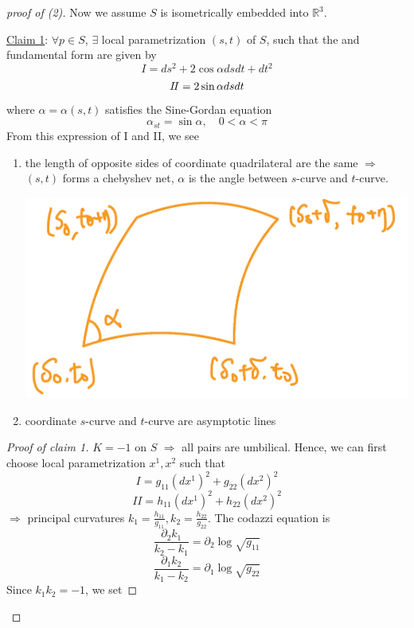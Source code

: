 \begin{proof}[proof of (2)]
    Now we assume \(S\) is isometrically embedded into \(\mathbb{R}^3\).

    \underline{Claim 1}: \(\forall p\in S\), \(\exists\) local parametrization
    \((s,t)\) of \(S\), such that the  and 
     fundamental form are given by
    \[
      I=ds^2+2\cos \alpha ds dt +dt^2  
    \]   
    \[I\!I=2\sin\alpha ds dt\]
    where \(\alpha=\alpha(s,t)\) satisfies the Sine-Gordan equation
    \[\alpha_{st}=\sin \alpha,\quad 0<\alpha<\pi\]
    From this expression of I and II, we see
    \begin{enumerate}[(1)]
        \item the length of opposite sides of coordinate quadrilateral
        are the same \(\Rightarrow\) \((s,t)\) forms a chebyshev net,
        \(\alpha\) is the angle between \(s\)-curve and \(t\)-curve.
        \begin{center}
            \includegraphics[scale=0.2]{picture/week15/quadrilateral.png}
        \end{center}
        \item coordinate \(s\)-curve and \(t\)-curve are asymptotic lines
    \end{enumerate}
    \begin{proof}[Proof of claim 1]
        \(K=-1\) on \(S\) \(\Rightarrow\) all pairs are umbilical.
        Hence, we can first choose local parametrization \(x^1,x^2\)
        such that 
        \[I=g_{11}(dx^1)^2+g_{22}(dx^2)^2\]
        \[II=h_{11}(dx^1)^2+h_{22}(dx^2)^2\]
    \(\Rightarrow\) principal curvatures \(k_1=\frac{h_{11}}{g_{11}},
    k_2=\frac{h_{22}}{g_{22}}\).
    The codazzi equation is 
    \[\frac{\partial_2k_1}{k_2-k_1}=\partial_2 \log \sqrt{g_{11}}\]
    \[\frac{\partial_1k_2}{k_1-k_2}=\partial_1 \log \sqrt{g_{22}}\]
    Since \(k_1k_2=-1\), we set 

\end{proof}
\end{proof}
